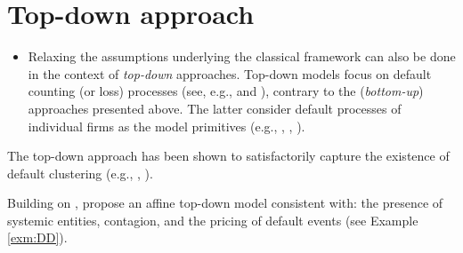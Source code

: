 \documentclass[
  12pt,
]{book}
\providecommand{\tightlist}{%
  \setlength{\itemsep}{0pt}\setlength{\parskip}{0pt}}
\theoremstyle{definition}
\theoremstyle{definition}
\theoremstyle{definition}
\theoremstyle{definition}
\theoremstyle{remark}
\begin{document}
\hypertarget{CreditDD}{%
\section{Top-down approach}\label{CreditDD}}

\begin{itemize}
\tightlist
\item
  Relaxing the assumptions underlying the classical framework can also be done in the context of \emph{top-down} approaches. Top-down models focus on default counting (or loss) processes (see, e.g., \citet{AZIZPOUR20111340} and \citet{Giesecke_Goldberg_Ding_2011}), contrary to the (\emph{bottom-up}) approaches presented above. The latter consider default processes of individual firms as the model primitives (e.g., \citet{Lando_1998}, \citet{Duffie_Singleton_1999}, \citet{Duffie_Garleanu_2001}).
\end{itemize}

The top-down approach has been shown to satisfactorily capture the existence of default clustering (e.g., \citet{Brigo_et_al_2007}, \citet{Errais_Giesecke_Goldberg_2010}).

Building on \citet{Gourieroux_Monfort_Renne_2014}, \citet{Gourieroux_Monfort_Mouabbi_Renne_2021} propose an affine top-down model consistent with: the presence of systemic entities, contagion, and the pricing of default events (see Example \ref{exm:DD}).
\end{document}

